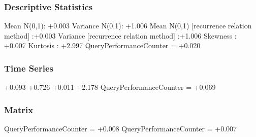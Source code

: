 \documentclass[9pt]{article}
\theoremstyle{plain}
\theoremstyle{definition}
\theoremstyle{remark}
\numberwithin{equation}{section}
\begin{document}
\subsubsection{Descriptive Statistics}
Mean N(0,1): +0.003
Variance N(0,1): +1.006
Mean N(0,1) [recurrence relation method] :+0.003
Variance [recurrence relation method] :+1.006
Skewness : +0.007
Kurtosis : +2.997
QueryPerformanceCounter  =  +0.020
\subsubsection{Time Series }
+0.093
+0.726
+0.011
+2.178
QueryPerformanceCounter  =  +0.069
\subsubsection{Matrix}
QueryPerformanceCounter  =  +0.008
QueryPerformanceCounter  =  +0.007
\end{document}
